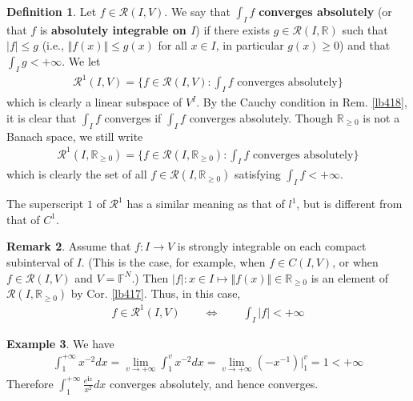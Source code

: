 \documentclass[12pt,b5paper,notitlepage]{article}
\theoremstyle{definition}
\newtheorem{df}{Definition}[section]
\newtheorem{eg}[df]{Example}
\newtheorem{rem}[df]{Remark}
\theoremstyle{plain}
\newcommand{\scr}{\mathscr}
\newcommand{\im}{\mathbf{i}}
\newcommand{\Rbb}{\mathbb R}
\newcommand{\Fbb}{\mathbb F}
\newcommand{\dps}{\displaystyle}
\numberwithin{equation}{section}
\begin{document}
\begin{df}\label{lb421}
Let $f\in\scr R(I,V)$. We say that $\int_If$ \textbf{converges absolutely}  (or that $f$ is \textbf{absolutely integrable on $I$})  if there exists $g\in\scr R(I,\Rbb)$ such that $|f|\leq g$ (i.e., $\Vert f(x)\Vert\leq g(x)$ for all $x\in I$, in particular $g(x)\geq0$) and that $\int_I g<+\infty$. We let \index{R1@$\scr R^1(I,V)$}
\begin{align}
\textstyle\scr R^1(I,V)=\big\{f\in\scr R(I,V):\int_If\text{ converges absolutely}\big\}
\end{align}
which is clearly a linear subspace of $V^I$. By the Cauchy condition in Rem. \ref{lb418}, it is clear that $\int_If$ converges if $\int_If$ converges absolutely. Though $\Rbb_{\geq0}$ is not a Banach space, we still write
\begin{align*}
\textstyle\scr R^1(I,\Rbb_{\geq0})=\big\{f\in\scr R(I,\Rbb_{\geq0}):\int_If\text{ converges absolutely}\big\}
\end{align*}
which is clearly the set of all $f\in\scr R(I,\Rbb_{\geq0})$ satisfying $\int_If<+\infty$.
\end{df}




The superscript $1$ of $\scr R^1$ has a similar meaning as that of $l^1$, but is different from that of $C^1$.



\begin{rem}
Assume that $f:I\rightarrow V$ is strongly integrable on each compact subinterval of $I$. (This is the case, for example, when $f\in C(I,V)$, or when $f\in\scr R(I,V)$ and $V=\Fbb^N$.) Then $|f|:x\in I\mapsto \Vert f(x)\Vert\in\Rbb_{\geq0}$ is an element of $\scr R(I,\Rbb_{\geq0})$ by Cor. \ref{lb417}. Thus, in this case,
\begin{align*}
f\in\scr R^1(I,V)\qquad\Longleftrightarrow\qquad \int_I |f|<+\infty
\end{align*}
\end{rem}


\begin{eg}
We have
\begin{align*}
\int_1^{+\infty}x^{-2}dx=\lim_{v\rightarrow+\infty}\int_1^v x^{-2}dx=\lim_{v\rightarrow+\infty}(-x^{-1})\big|_1^v=1<+\infty
\end{align*}
Therefore $\dps\int_1^{+\infty} \frac{e^{\im x}}{x^2}dx$ converges absolutely, and hence converges.
\end{eg}
\end{document}
